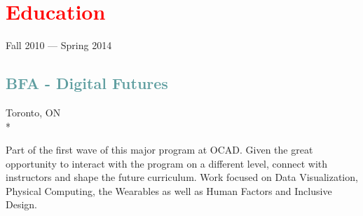 \section{\textcolor{red}{Education}}

\noindent
Fall 2010 --- Spring 2014 \\

\subsection{\textcolor{CadetBlue}{\LARGE{BFA - Digital Futures}}}

Toronto, ON \\*

Part of the first wave of this major program at OCAD. Given the great opportunity to interact with the program on a different level, connect with instructors and shape the future curriculum.
Work focused on Data Visualization, Physical Computing, the Wearables as well as Human Factors and Inclusive Design.

